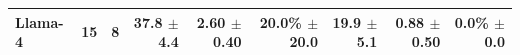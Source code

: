 \begin{table}[t]
\begin{tabular*}{\textwidth}{@{\extracolsep{\fill}}lrrrrrrrr@{}}
Llama-4 & 15 & 8 & \shortstack[r]{37.8\\{\scriptsize $\pm$4.4}} & \shortstack[r]{2.60\\{\scriptsize $\pm$0.40}} & \shortstack[r]{20.0\%\\{\scriptsize $\pm$20.0}} & \shortstack[r]{19.9\\{\scriptsize $\pm$5.1}} & \shortstack[r]{0.88\\{\scriptsize $\pm$0.50}} & \shortstack[r]{0.0\%\\{\scriptsize $\pm$0.0}} \\
\bottomrule
\end{tabular*}
\end{table}
